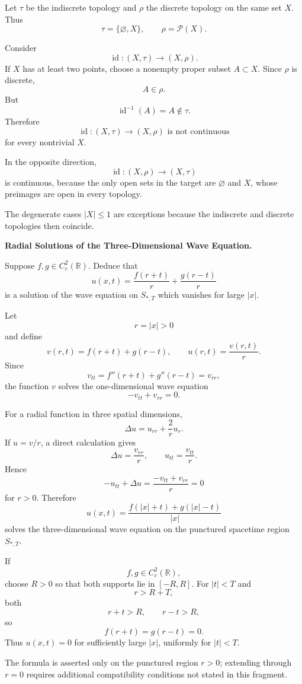 \begin{solution}
Let \(\tau\) be the indiscrete topology and \(\rho\) the discrete topology on the same set
\(X\). Thus
\[
\tau=\{\varnothing,X\},
\qquad
\rho=\mathcal P(X).
\]

Consider
\[
\operatorname{id}:(X,\tau)\to(X,\rho).
\]
If \(X\) has at least two points, choose a nonempty proper subset \(A\subset X\). Since
\(\rho\) is discrete,
\[
A\in\rho.
\]
But
\[
\operatorname{id}^{-1}(A)=A\notin\tau.
\]
Therefore
\[
\boxed{
\operatorname{id}:(X,\tau)\to(X,\rho)
\text{ is not continuous}
}
\]
for every nontrivial \(X\).

In the opposite direction,
\[
\operatorname{id}:(X,\rho)\to(X,\tau)
\]
is continuous, because the only open sets in the target are \(\varnothing\) and \(X\), whose
preimages are open in every topology.

The degenerate cases \(|X|\le1\) are exceptions because the indiscrete and discrete
topologies then coincide.
\end{solution}


\begin{problem}[CP-II-0011]
\label{prob:cp-ii-0011}
\textbf{Radial Solutions of the Three-Dimensional Wave Equation.}

\hspace*{1.5em}Suppose $f,g\in C_c^2(\mathbb{R})$. Deduce that
	\[
	u(x,t) = \frac{f(r+t)}{r} + \frac{g(r-t)}{r}
	\]
	is a solution of the wave equation on $S_{*,T}$ which vanishes for
	large $|x|$.
\end{problem}

\begin{solution}
Let
\[
r=|x|>0
\]
and define
\[
v(r,t)=f(r+t)+g(r-t),
\qquad
u(r,t)=\frac{v(r,t)}r.
\]
Since
\[
v_{tt}
=
f''(r+t)+g''(r-t)
=
v_{rr},
\]
the function \(v\) solves the one-dimensional wave equation
\[
-v_{tt}+v_{rr}=0.
\]

For a radial function in three spatial dimensions,
\[
\Delta u
=
u_{rr}+\frac2r u_r.
\]
If \(u=v/r\), a direct calculation gives
\[
\Delta u
=
\frac{v_{rr}}r,
\qquad
u_{tt}
=
\frac{v_{tt}}r.
\]
Hence
\[
-u_{tt}+\Delta u
=
\frac{-v_{tt}+v_{rr}}r
=
0
\]
for \(r>0\). Therefore
\[
\boxed{
u(x,t)
=
\frac{f(|x|+t)+g(|x|-t)}{|x|}
}
\]
solves the three-dimensional wave equation on the punctured spacetime region \(S_{*,T}\).

If
\[
f,g\in C_c^2(\mathbb R),
\]
choose \(R>0\) so that both supports lie in \([-R,R]\). For \(|t|<T\) and
\[
r>R+T,
\]
both
\[
r+t>R,
\qquad
r-t>R,
\]
so
\[
f(r+t)=g(r-t)=0.
\]
Thus \(u(x,t)=0\) for sufficiently large \(|x|\), uniformly for \(|t|<T\).

The formula is asserted only on the punctured region \(r>0\); extending through \(r=0\)
requires additional compatibility conditions not stated in this fragment.
\end{solution}


